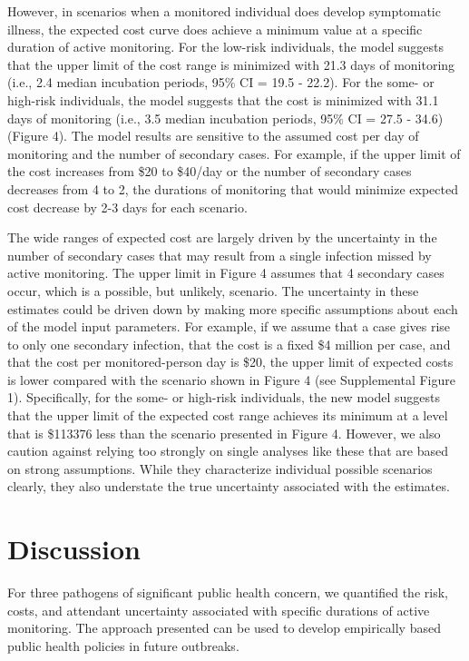\documentclass[]{article}
\begin{document}
However, in scenarios when a monitored individual does develop
symptomatic illness, the expected cost curve does achieve a minimum
value at a specific duration of active monitoring. For the low-risk
individuals, the model suggests that the upper limit of the cost range
is minimized with 21.3 days of monitoring (i.e., 2.4 median incubation
periods, 95\% CI = 19.5 - 22.2). For the some- or high-risk individuals,
the model suggests that the cost is minimized with 31.1 days of
monitoring (i.e., 3.5 median incubation periods, 95\% CI = 27.5 - 34.6)
(Figure 4). The model results are sensitive to the assumed cost per day
of monitoring and the number of secondary cases. For example, if the
upper limit of the cost increases from \$20 to \$40/day or the number of
secondary cases decreases from 4 to 2, the durations of monitoring that
would minimize expected cost decrease by 2-3 days for each scenario.

The wide ranges of expected cost are largely driven by the uncertainty
in the number of secondary cases that may result from a single infection
missed by active monitoring. The upper limit in Figure 4 assumes that 4
secondary cases occur, which is a possible, but unlikely, scenario. The
uncertainty in these estimates could be driven down by making more
specific assumptions about each of the model input parameters. For
example, if we assume that a case gives rise to only one secondary
infection, that the cost is a fixed \$4 million per case, and that the
cost per monitored-person day is \$20, the upper limit of expected costs
is lower compared with the scenario shown in Figure 4 (see Supplemental
Figure 1). Specifically, for the some- or high-risk individuals, the new
model suggests that the upper limit of the expected cost range achieves
its minimum at a level that is \$113376 less than the scenario presented
in Figure 4. However, we also caution against relying too strongly on
single analyses like these that are based on strong assumptions. While
they characterize individual possible scenarios clearly, they also
understate the true uncertainty associated with the estimates.

\section{Discussion}\label{discussion}

For three pathogens of significant public health concern, we quantified
the risk, costs, and attendant uncertainty associated with specific
durations of active monitoring. The approach presented can be used to
develop empirically based public health policies in future outbreaks.
\end{document}
